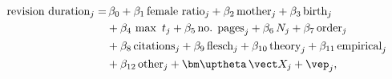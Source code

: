 \begin{equation}\label{equation16}
\begin{split}
	\text{revision duration}_j = 	&\, \beta_0+\beta_1\,\text{female ratio}_j +\beta_2\,\text{mother}_j + \beta_3\,\text{birth}_j \\
									& + \beta_4\,\max~t_j + \beta_5\,\text{no. pages}_j + \beta_6\,N_j + \beta_7\,\text{order}_j \\
									& + \beta_8\,\text{citations}_j + \beta_9\,\text{flesch}_j + \beta_{10}\,\text{theory}_j + \beta_{11}\,\text{empirical}_j\\
									& + \beta_{12}\,\text{other}_j + \bm\uptheta\,\vect X_j + \vep_j,
\end{split}
\end{equation}